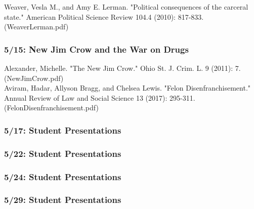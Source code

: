 \documentclass[12pt,letterpaper]{article}
\numberwithin{equation}{section}
\begin{document}
\noindent Weaver, Vesla M., and Amy E. Lerman. "Political consequences of the carceral state." American Political Science Review 104.4 (2010): 817-833. (WeaverLerman.pdf)\\

\subsubsection{5/15: New Jim Crow and the War on Drugs}
\noindent Alexander, Michelle. "The New Jim Crow." Ohio St. J. Crim. L. 9 (2011): 7. (NewJimCrow.pdf)\\

\noindent Aviram, Hadar, Allyson Bragg, and Chelsea Lewis. "Felon Disenfranchisement." Annual Review of Law and Social Science 13 (2017): 295-311. (FelonDisenfranchisement.pdf)\\
\subsubsection{5/17: Student Presentations} 

\subsubsection{5/22: Student Presentations} 

\subsubsection{5/24: Student Presentations} 

\subsubsection{5/29: Student Presentations}
\end{document}
